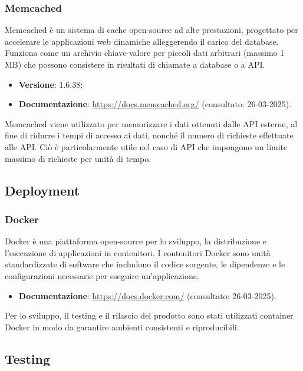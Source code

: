 \subsubsection{Memcached}
Memcached è un sistema di cache open-source ad alte prestazioni, progettato per
accelerare le applicazioni web dinamiche alleggerendo il carico del database.
Funziona come un archivio chiave-valore per piccoli dati arbitrari (massimo 1
MB) che possono consistere in risultati di chiamate a database o a API.
\begin{itemize}
    \item \textbf{Versione}: 1.6.38;
    \item \textbf{Documentazione}: \url{https://docs.memcached.org/} (consultato:
          26-03-2025).
\end{itemize}
Memcached viene utilizzato per memorizzare i dati ottenuti dalle API esterne,
al fine di ridurre i tempi di accesso ai dati, nonché il numero di richieste
effettuate alle API. Ciò è particolarmente utile nel caso di API che impongono
un limite massimo di richieste per unità di tempo.

\subsection{Deployment}
\subsubsection{Docker}
Docker è una piattaforma open-source per lo sviluppo, la distribuzione e
l'esecuzione di applicazioni in contenitori. I contenitori Docker sono unità
standardizzate di software che includono il codice sorgente, le dipendenze e le
configurazioni necessarie per eseguire un'applicazione.
\begin{itemize}
    \item \textbf{Documentazione}: \url{https://docs.docker.com/} (consultato:
          26-03-2025).
\end{itemize}
Per lo sviluppo, il testing e il rilascio del prodotto sono stati utilizzati container Docker in
modo da garantire ambienti consistenti e riproducibili.

\subsection{Testing}
